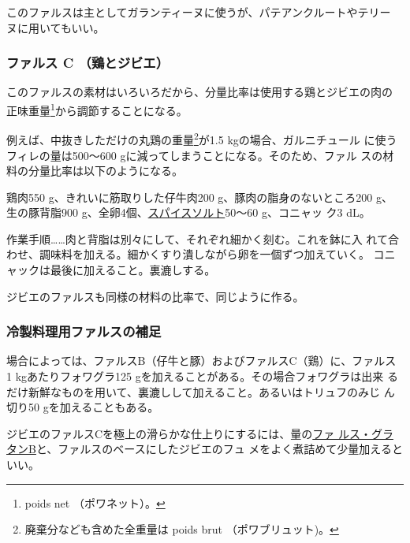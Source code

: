 \begin{recette}
このファルスは主としてガランティーヌに使うが、パテアンクルートやテリー
ヌに用いてもいい。

\hypertarget{farce-froide-c}{%
\subsubsection{ファルス C （鶏とジビエ）}\label{farce-froide-c}}



このファルスの素材はいろいろだから、分量比率は使用する鶏とジビエの肉の
正味重量\footnote{poids net （ポワネット）。}から調節することになる。

例えば、中抜きしただけの丸鶏の重量\footnote{廃棄分なども含めた全重量は
  poids brut （ポワブリュット)。}が1.5 kgの場合、ガルニチュール
に使うフィレの量は500〜600 gに減ってしまうことになる。そのため、ファル
スの材料の分量比率は以下のようになる。

鶏肉550 g、きれいに筋取りした仔牛肉200 g、豚肉の脂身のないところ200 g、
生の豚背脂900
g、全卵4個、\protect\hyperlink{sel-epice}{スパイスソルト}50〜60
g、コニャッ ク3 dL。

作業手順\ldots{}\ldots{}肉と背脂は別々にして、それぞれ細かく刻む。これを鉢に入
れて合わせ、調味料を加える。細かくすり潰しながら卵を一個ずつ加えていく。
コニャックは最後に加えること。裏漉しする。

ジビエのファルスも同様の材料の比率で、同じように作る。

\hypertarget{observation-sur-les-farces}{%
\subsubsection{冷製料理用ファルスの補足}\label{observation-sur-les-farces}}

場合によっては、ファルスB（仔牛と豚）およびファルスC（鶏）に、ファルス 1
kgあたりフォワグラ125 gを加えることがある。その場合フォワグラは出来
るだけ新鮮なものを用いて、裏漉しして加えること。あるいはトリュフのみじ
ん切り50 gを加えることもある。

ジビエのファルスCを極上の滑らかな仕上りにするには、\unquart{}量の\protect\hyperlink{farce-gratin-b}{ファ
ルス・グラタンB}と、ファルスのベースにしたジビエのフュ
メをよく煮詰めて少量加えるといい。
\end{recette}
